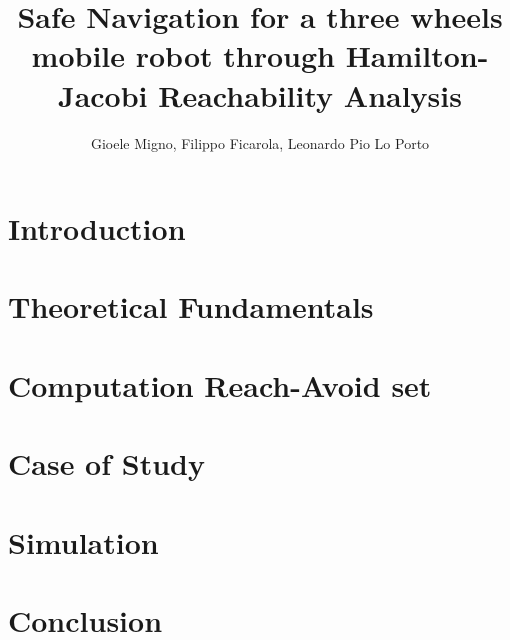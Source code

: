 \documentclass[conference]{IEEEtran}
\begin{document}
    
    \title{Safe Navigation for a three wheels mobile robot through Hamilton-Jacobi Reachability Analysis}
    \author{Gioele Migno, Filippo Ficarola, Leonardo Pio Lo Porto}
    \maketitle
    
    
    
    \section{Introduction}
        \label{introduction}
        
    
    \section{Theoretical Fundamentals}
        \label{theoretical_fundamentals}
        
    
    \section{Computation Reach-Avoid set}
        \label{comp_ras}
        

    \section{Case of Study}
        \label{case_of_study}
        

    \section{Simulation}
        \label{simulation}
        
        
    \section{Conclusion}
        

    \clearpage
    \appendix
        

    \newpage
    
\end{document}
